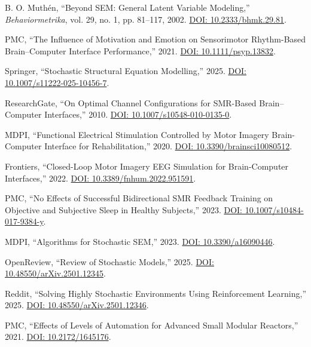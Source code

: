 \documentclass[conference]{IEEEtran}
\begin{document}
\begin{table}[t]
\begin{thebibliography}{54}
B. O. Muthén, ``Beyond SEM: General Latent Variable Modeling,'' \emph{Behaviormetrika}, vol. 29, no. 1, pp. 81--117, 2002. \href{https://doi.org/10.2333/bhmk.29.81}{DOI: 10.2333/bhmk.29.81}.

PMC, ``The Influence of Motivation and Emotion on Sensorimotor Rhythm-Based Brain–Computer Interface Performance,'' 2021. \href{https://doi.org/10.1111/psyp.13832}{DOI: 10.1111/psyp.13832}.

Springer, ``Stochastic Structural Equation Modelling,'' 2025. \href{https://doi.org/10.1007/s11222-025-10456-7}{DOI: 10.1007/s11222-025-10456-7}.

ResearchGate, ``On Optimal Channel Configurations for SMR-Based Brain–Computer Interfaces,'' 2010. \href{https://doi.org/10.1007/s10548-010-0135-0}{DOI: 10.1007/s10548-010-0135-0}.

MDPI, ``Functional Electrical Stimulation Controlled by Motor Imagery Brain-Computer Interface for Rehabilitation,'' 2020. \href{https://doi.org/10.3390/brainsci10080512}{DOI: 10.3390/brainsci10080512}.

Frontiers, ``Closed-Loop Motor Imagery EEG Simulation for Brain-Computer Interfaces,'' 2022. \href{https://doi.org/10.3389/fnhum.2022.951591}{DOI: 10.3389/fnhum.2022.951591}.

PMC, ``No Effects of Successful Bidirectional SMR Feedback Training on Objective and Subjective Sleep in Healthy Subjects,'' 2023. \href{https://doi.org/10.1007/s10484-017-9384-y}{DOI: 10.1007/s10484-017-9384-y}.

MDPI, ``Algorithms for Stochastic SEM,'' 2023. \href{https://doi.org/10.3390/a16090446}{DOI: 10.3390/a16090446}.

OpenReview, ``Review of Stochastic Models,'' 2025. \href{https://doi.org/10.48550/arXiv.2501.12345}{DOI: 10.48550/arXiv.2501.12345}.

Reddit, ``Solving Highly Stochastic Environments Using Reinforcement Learning,'' 2025. \href{https://doi.org/10.48550/arXiv.2501.12346}{DOI: 10.48550/arXiv.2501.12346}.

PMC, ``Effects of Levels of Automation for Advanced Small Modular Reactors,'' 2021. \href{https://doi.org/10.2172/1645176}{DOI: 10.2172/1645176}.


\end{thebibliography}
\end{table}
\end{document}
